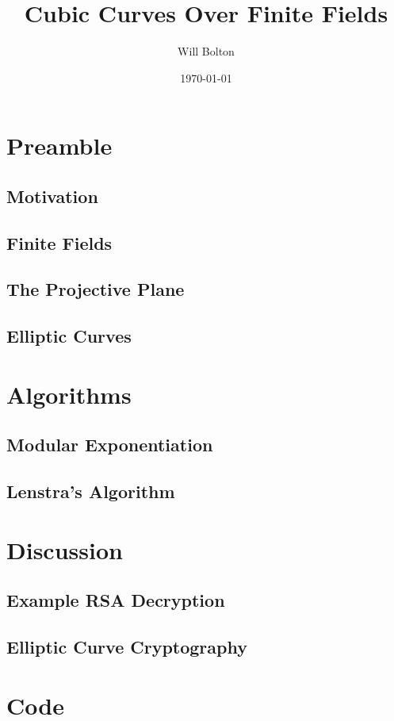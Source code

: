 \documentclass[12pt,titlepage]{article}
\title{Cubic Curves Over Finite Fields}
\author{Will Bolton}
\date{\today}
\begin{document}
\maketitle
\tableofcontents
\clearpage

\section{Preamble}
\subsection{Motivation}

\cite{silverman-rational}
\cite{silverman-arithmetic}
\cite{111-lectures}
\cite{323-lectures}
\cite{menezes1996}
\subsection{Finite Fields}

\subsection{The Projective Plane}

\subsection{Elliptic Curves}




\section{Algorithms}
\subsection{Modular Exponentiation}

\subsection{Lenstra's Algorithm}


\section{Discussion}
\subsection{Example RSA Decryption}

\subsection{Elliptic Curve Cryptography}


\appendix
\section{Code}
%


\end{document}
